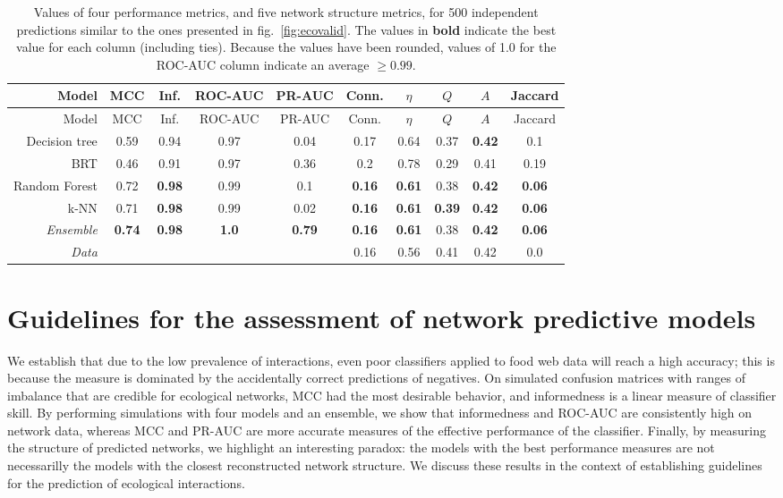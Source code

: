 \documentclass[10pt,oneside]{article}
\begin{document}
\hypertarget{tbl:comparison}{}
\begin{longtable}[]{@{}rccccccccc@{}}
\caption{\label{tbl:comparison}Values of four performance metrics, and
five network structure metrics, for 500 independent predictions similar
to the ones presented in fig.~\ref{fig:ecovalid}. The values in
\textbf{bold} indicate the best value for each column (including ties).
Because the values have been rounded, values of 1.0 for the ROC-AUC
column indicate an average \(\ge 0.99\).}\tabularnewline
\toprule
Model & MCC & Inf. & ROC-AUC & PR-AUC & Conn. & \(\eta\) & \(Q\) & \(A\)
& Jaccard\tabularnewline
\midrule
\endfirsthead
\toprule
Model & MCC & Inf. & ROC-AUC & PR-AUC & Conn. & \(\eta\) & \(Q\) & \(A\)
& Jaccard\tabularnewline
\midrule
\endhead
Decision tree & 0.59 & 0.94 & 0.97 & 0.04 & 0.17 & 0.64 & 0.37 &
\textbf{0.42} & 0.1\tabularnewline
BRT & 0.46 & 0.91 & 0.97 & 0.36 & 0.2 & 0.78 & 0.29 & 0.41 &
0.19\tabularnewline
Random Forest & 0.72 & \textbf{0.98} & 0.99 & 0.1 & \textbf{0.16} &
\textbf{0.61} & 0.38 & \textbf{0.42} & \textbf{0.06}\tabularnewline
k-NN & 0.71 & \textbf{0.98} & 0.99 & 0.02 & \textbf{0.16} &
\textbf{0.61} & \textbf{0.39} & \textbf{0.42} &
\textbf{0.06}\tabularnewline
\emph{Ensemble} & \textbf{0.74} & \textbf{0.98} & \textbf{1.0} &
\textbf{0.79} & \textbf{0.16} & \textbf{0.61} & 0.38 & \textbf{0.42} &
\textbf{0.06}\tabularnewline
\emph{Data} & & & & & 0.16 & 0.56 & 0.41 & 0.42 & 0.0\tabularnewline
\bottomrule
\end{longtable}

\hypertarget{guidelines-for-the-assessment-of-network-predictive-models}{%
\section{Guidelines for the assessment of network predictive
models}\label{guidelines-for-the-assessment-of-network-predictive-models}}

We establish that due to the low prevalence of interactions, even poor
classifiers applied to food web data will reach a high accuracy; this is
because the measure is dominated by the accidentally correct predictions
of negatives. On simulated confusion matrices with ranges of imbalance
that are credible for ecological networks, MCC had the most desirable
behavior, and informedness is a linear measure of classifier skill. By
performing simulations with four models and an ensemble, we show that
informedness and ROC-AUC are consistently high on network data, whereas
MCC and PR-AUC are more accurate measures of the effective performance
of the classifier. Finally, by measuring the structure of predicted
networks, we highlight an interesting paradox: the models with the best
performance measures are not necessarilly the models with the closest
reconstructed network structure. We discuss these results in the context
of establishing guidelines for the prediction of ecological
interactions.
\end{document}
